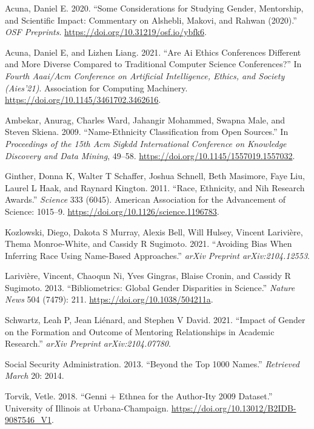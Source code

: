 \documentclass[]{article}
\begin{document}
\hypertarget{refs}{}
\leavevmode\hypertarget{ref-acuna2020some}{}%
Acuna, Daniel E. 2020. ``Some Considerations for Studying Gender,
Mentorship, and Scientific Impact: Commentary on Alshebli, Makovi, and
Rahwan (2020).'' \emph{OSF Preprints}.
\url{https://doi.org/10.31219/osf.io/ybfk6}.

\leavevmode\hypertarget{ref-acuna2021are}{}%
Acuna, Daniel E, and Lizhen Liang. 2021. ``Are Ai Ethics Conferences
Different and More Diverse Compared to Traditional Computer Science
Conferences?'' In \emph{Fourth Aaai/Acm Conference on Artificial
Intelligence, Ethics, and Society (Aies'21)}. Association for Computing
Machinery. \url{https://doi.org/10.1145/3461702.3462616}.

\leavevmode\hypertarget{ref-ambekar2009name}{}%
Ambekar, Anurag, Charles Ward, Jahangir Mohammed, Swapna Male, and
Steven Skiena. 2009. ``Name-Ethnicity Classification from Open
Sources.'' In \emph{Proceedings of the 15th Acm Sigkdd International
Conference on Knowledge Discovery and Data Mining}, 49--58.
\url{https://doi.org/10.1145/1557019.1557032}.

\leavevmode\hypertarget{ref-ginther2011race}{}%
Ginther, Donna K, Walter T Schaffer, Joshua Schnell, Beth Masimore, Faye
Liu, Laurel L Haak, and Raynard Kington. 2011. ``Race, Ethnicity, and
Nih Research Awards.'' \emph{Science} 333 (6045). American Association
for the Advancement of Science: 1015--9.
\url{https://doi.org/10.1126/science.1196783}.

\leavevmode\hypertarget{ref-kozlowski2021avoiding}{}%
Kozlowski, Diego, Dakota S Murray, Alexis Bell, Will Hulsey, Vincent
Larivière, Thema Monroe-White, and Cassidy R Sugimoto. 2021. ``Avoiding
Bias When Inferring Race Using Name-Based Approaches.'' \emph{arXiv
Preprint arXiv:2104.12553}.

\leavevmode\hypertarget{ref-lariviere2013bibliometrics}{}%
Larivière, Vincent, Chaoqun Ni, Yves Gingras, Blaise Cronin, and Cassidy
R Sugimoto. 2013. ``Bibliometrics: Global Gender Disparities in
Science.'' \emph{Nature News} 504 (7479): 211.
\url{https://doi.org/10.1038/504211a}.

\leavevmode\hypertarget{ref-schwartz2021impact}{}%
Schwartz, Leah P, Jean Liénard, and Stephen V David. 2021. ``Impact of
Gender on the Formation and Outcome of Mentoring Relationships in
Academic Research.'' \emph{arXiv Preprint arXiv:2104.07780}.

\leavevmode\hypertarget{ref-social2013beyond}{}%
Social Security Administration. 2013. ``Beyond the Top 1000 Names.''
\emph{Retrieved March} 20: 2014.

\leavevmode\hypertarget{ref-illinoisdatabankIDB-9087546}{}%
Torvik, Vetle. 2018. ``Genni + Ethnea for the Author-Ity 2009 Dataset.''
University of Illinois at Urbana-Champaign.
\url{https://doi.org/10.13012/B2IDB-9087546_V1}.
\end{document}
